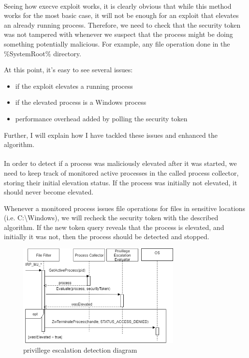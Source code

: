         \paragraph{}
        Seeing how execve exploit works, it is clearly obvious that while this method works for the most basic case, it will not be enough for an
        exploit that elevates an already running process. Therefore, we need to check that the security token was not tampered with whenever we
        suspect that the process might be doing something potentially malicious. For example, any file operation done in the \%SystemRoot\%
        directory.

        At this point, it's easy to see several issues:

        \begin{itemize}
            \item if the exploit elevates a running process
            \item if the elevated process is a Windows process
            \item performance overhead added by polling the security token
        \end{itemize}

        Further, I will explain how I have tackled these issues and enhanced the algorithm.

        \paragraph{}
        In order to detect if a process was maliciously elevated after it was started, we need to keep track of monitored active processes in the
        called process collector, storing their initial elevation status. If the process was initially not elevated, it should never become
        elevated.

        Whenever a monitored process issues file operations for files in sensitive locations (i.e. C:\textbackslash Windows), we will recheck
        the security token with the described algorithm. If the new token query reveals that the process is elevated, and initially it was not,
        then the process should be detected and stopped.

        \pagebreak

        \begin{figure}[!ht]
            \centering
            \includegraphics[width=310px,keepaspectratio]{img/privilege_escalation_detection_diagram.png}
            \caption{privillege escalation detection diagram}
            \label{fig:privilege_escalation_detection_diagram}
        \end{figure}


